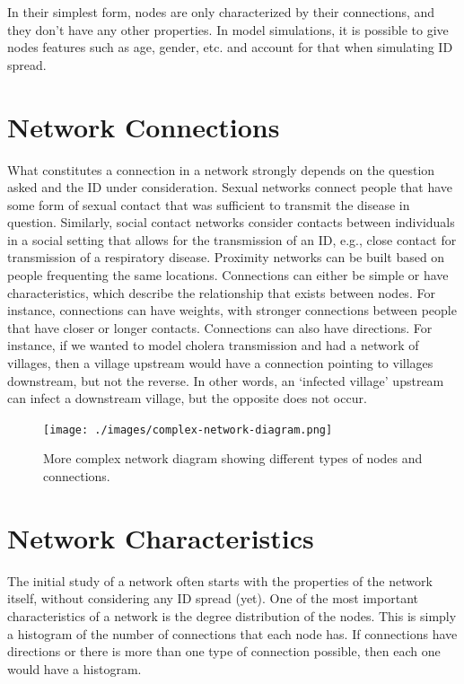 \documentclass[
]{book}
\begin{document}
In their simplest form, nodes are only characterized by their connections, and they don't have any other properties. In model simulations, it is possible to give nodes features such as age, gender, etc. and account for that when simulating ID spread.

\hypertarget{network-connections}{%
\section{Network Connections}\label{network-connections}}

What constitutes a connection in a network strongly depends on the question asked and the ID under consideration. Sexual networks connect people that have some form of sexual contact that was sufficient to transmit the disease in question. Similarly, social contact networks consider contacts between individuals in a social setting that allows for the transmission of an ID, e.g., close contact for transmission of a respiratory disease. Proximity networks can be built based on people frequenting the same locations. Connections can either be simple or have characteristics, which describe the relationship that exists between nodes. For instance, connections can have weights, with stronger connections between people that have closer or longer contacts. Connections can also have directions. For instance, if we wanted to model cholera transmission and had a network of villages, then a village upstream would have a connection pointing to villages downstream, but not the reverse. In other words, an `infected village' upstream can infect a downstream village, but the opposite does not occur.

\begin{figure}
\centering
\texttt{[image: ./images/complex-network-diagram.png]}
\caption{More complex network diagram showing different types of nodes and connections.}
\end{figure}

\hypertarget{network-characteristics}{%
\section{Network Characteristics}\label{network-characteristics}}

The initial study of a network often starts with the properties of the network itself, without considering any ID spread (yet). One of the most important characteristics of a network is the degree distribution of the nodes. This is simply a histogram of the number of connections that each node has. If connections have directions or there is more than one type of connection possible, then each one would have a histogram.
\end{document}

